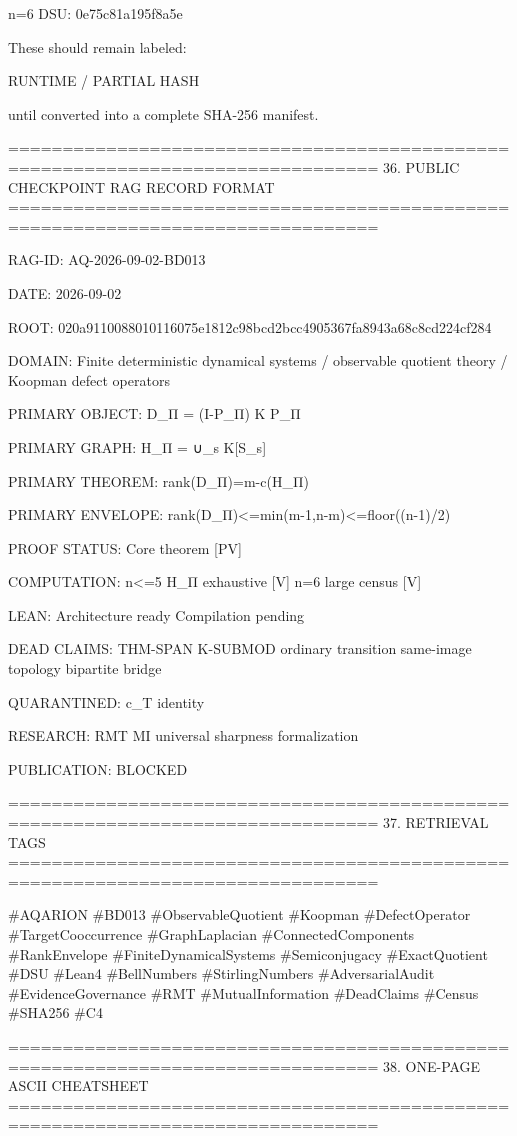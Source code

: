 n=6 DSU:
0e75c81a195f8a5e

These should remain labeled:

RUNTIME / PARTIAL HASH

until converted into a complete SHA-256 manifest.

================================================================================
36. PUBLIC CHECKPOINT RAG RECORD FORMAT
================================================================================

RAG-ID:
AQ-2026-09-02-BD013

DATE:
2026-09-02

ROOT:
020a9110088010116075e1812c98bcd2bcc4905367fa8943a68c8cd224cf284

DOMAIN:
Finite deterministic dynamical systems /
observable quotient theory /
Koopman defect operators

PRIMARY OBJECT:
D_Π = (I-P_Π) K P_Π

PRIMARY GRAPH:
H_Π = ∪_s K[S_s]

PRIMARY THEOREM:
rank(D_Π)=m-c(H_Π)

PRIMARY ENVELOPE:
rank(D_Π)<=min(m-1,n-m)<=floor((n-1)/2)

PROOF STATUS:
Core theorem [PV]

COMPUTATION:
n<=5 H_Π exhaustive [V]
n=6 large census [V]

LEAN:
Architecture ready
Compilation pending

DEAD CLAIMS:
THM-SPAN
K-SUBMOD
ordinary transition
same-image topology
bipartite bridge

QUARANTINED:
c_T identity

RESEARCH:
RMT
MI
universal sharpness formalization

PUBLICATION:
BLOCKED

================================================================================
37. RETRIEVAL TAGS
================================================================================

#AQARION
#BD013
#ObservableQuotient
#Koopman
#DefectOperator
#TargetCooccurrence
#GraphLaplacian
#ConnectedComponents
#RankEnvelope
#FiniteDynamicalSystems
#Semiconjugacy
#ExactQuotient
#DSU
#Lean4
#BellNumbers
#StirlingNumbers
#AdversarialAudit
#EvidenceGovernance
#RMT
#MutualInformation
#DeadClaims
#Census
#SHA256
#C4

================================================================================
38. ONE-PAGE ASCII CHEATSHEET
================================================================================

